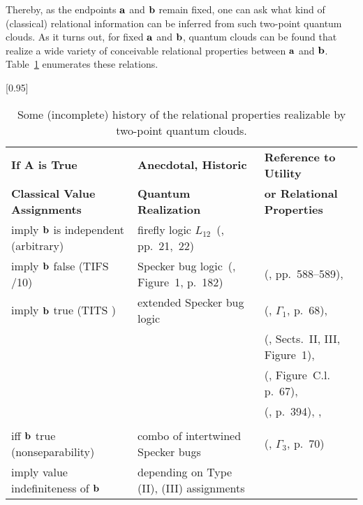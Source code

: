 Thereby, as the endpoints ${\bf a}$ and ${\bf b}$ remain fixed, one can ask what kind of (classical) {relational information} can
be inferred from such two-point quantum clouds.
As it turns out, for fixed ${\bf a}$ and ${\bf b}$, quantum clouds can be found that realize a wide variety
of conceivable relational properties between ${\bf a}$ and ${\bf b}$.
Table~\ref{2018-c-table1-conc-rel-info} enumerates these relations.
\begin{table}[H]
\centering \small
\caption{Some (incomplete) history of the relational properties realizable by two-point quantum clouds.}
\label{2018-c-table1-conc-rel-info}
\scalebox{0.95}[0.95]{
\begin{tabular}{lll}
\toprule
\textbf{If A is True} & \textbf{Anecdotal, Historic} & \textbf{Reference to Utility} \\
\textbf{Classical Value Assignments} & \textbf{Quantum Realization} & \textbf{or Relational Properties}\\
\midrule
imply ${\bf b}$ is independent (arbitrary) & firefly logic $L_{12}$~(\cite{cohen}, pp.~21,~22)& \\
imply ${\bf b}$ false (TIFS%
/10) & Specker bug logic~(\cite{Kochen2}, Figure~1, p.~182) & (\cite{stairs83}, pp.~588--589), \cite{Yu-2012,2018-minimalYIYS}\\
imply ${\bf b}$ true (TITS%
) & extended Specker bug logic & (\cite{Kochen1}, $\Gamma_1$, p.~68), \\
&&(\cite{clifton-93}, Sects.~II, III, Figure~1), \\
&&(\cite{Belinfante-73}, Figure~C.l. p.~67), \\
&&(\cite{Pitowsky-1982-subs}, p.~394), \cite{Hardy-92,Hardy-93,hardy-97}, \\
&&\cite{Cabello-1995-ppks,cabello-96,cabello-97-nhvp,Badziag-2011,Cabello-2013-HP,Cabello-2013-Hardylike,2018-minimalYIYS}\\
iff ${\bf b}$ true (nonseparability) & combo of intertwined Specker bugs & (\cite{Kochen1}, $\Gamma_3$, p.~70)\\
imply value indefiniteness of ${\bf b}$ & depending on Type (II), (III) assignments & \cite{pitowsky:218,2015-AnalyticKS}\\
\bottomrule
\end{tabular}
}
\end{table}

